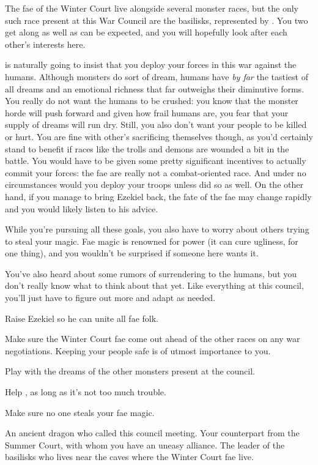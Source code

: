 \documentclass[char]{guildcamp2}
\begin{document}
The fae of the Winter Court live alongside several monster races, but the only such race present at this War Council are the basilisks, represented by \cBasilisk{\intro}. You two get along as well as can be expected, and you will hopefully look after each other's interests here.

\cOnyx{} is naturally going to insist that you deploy your forces in this war against the humans. Although monsters do sort of dream, humans have \emph{by far} the tastiest of all dreams and an emotional richness that far outweighs their diminutive forms. You really do not want the humans to be crushed: you know that the monster horde will push forward and given how frail humans are, you fear that your supply of dreams will run dry. Still, you also don't want your people to be killed or hurt. You are fine with other's sacrificing themselves though, as you'd certainly stand to benefit if races like the trolls and demons are wounded a bit in the battle. You would have to be given some pretty significant incentives to actually commit your forces: the fae are really not a combat-oriented race. And under no circumstances would you deploy your troops unless \cTreeFae{} did so as well. On the other hand, if you manage to bring Ezekiel back, the fate of the fae may change rapidly and you would likely listen to his advice.

While you're pursuing all these goals, you also have to worry about others trying to steal your magic.  Fae magic is renowned for power (it can cure ugliness, for one thing), and you wouldn't be surprised if someone here wants it.

You've also heard about some rumors of surrendering to the humans, but you don't really know what to think about that yet. Like everything at this council, you'll just have to figure out more and adapt as needed. 

\begin{itemz}[Goals]
  \item Raise Ezekiel so he can unite all fae folk.
  \item Make sure the Winter Court fae come out ahead of the other races on any war negotiations. Keeping your people safe is of utmost importance to you.
  \item Play with the dreams of the other monsters present at the council.
  \item Help \cBasilisk{}, as long as it's not too much trouble.
  \item Make sure no one steals your fae magic.
\end{itemz}


\begin{contacts}
  \contact{\cOnyx{}} An ancient dragon who called this council meeting.
  \contact{\cTreeFae{}} Your counterpart from the Summer Court, with whom you have an uneasy alliance.
  \contact{\cBasilisk{}} The leader of the basilisks who lives near the caves where the Winter Court fae live.
\end{contacts}
\end{document}
